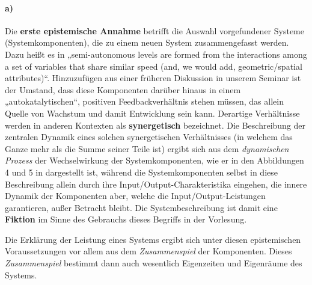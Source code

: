 \documentclass[11pt,a4paper]{article}
\begin{document}
\paragraph{a)}
Die \textbf{erste epistemische Annahme} betrifft die Auswahl vorgefundener
Systeme (Systemkomponenten), die zu einem neuen System zusammengefasst
werden. Dazu heißt es in \cite[S. 392]{Holling2000} „semi-autonomous levels
are formed from the interactions among a set of variables that share similar
speed (and, we would add, geometric/spatial attributes)“. Hinzuzufügen aus
einer früheren Diskussion in unserem Seminar ist der Umstand, dass diese
Komponenten darüber hinaus in einem „autokatalytischen“, positiven
Feedbackverhältnis stehen müssen, das allein Quelle von Wachstum und damit
Entwicklung sein kann.  Derartige Verhältnisse werden in anderen Kontexten als
\textbf{synergetisch} bezeichnet. Die Beschreibung der zentralen Dynamik eines
solchen synergetischen Verhältnisses (in welchem das Ganze mehr als die Summe
seiner Teile ist) ergibt sich aus dem \emph{dynamischen Prozess} der
Wechselwirkung der Systemkomponenten, wie er in den Abbildungen 4 und 5 in
\cite{Holling2000} dargestellt ist, während die Systemkomponenten selbst in
diese Beschreibung allein durch ihre Input/Output-Charakteristika eingehen,
die innere Dynamik der Komponenten aber, welche die Input/Output-Leistungen
garantieren, außer Betracht bleibt. Die Systembeschreibung ist damit eine
\textbf{Fiktion} im Sinne des Gebrauchs dieses Begriffs in der Vorlesung.

Die Erklärung der Leistung eines Systems ergibt sich unter diesen
epistemischen Voraussetzungen vor allem aus dem \emph{Zusammenspiel} der
Komponenten. Dieses \emph{Zusammenspiel} bestimmt dann auch wesentlich
Eigenzeiten und Eigenräume des Systems.
\end{document}
